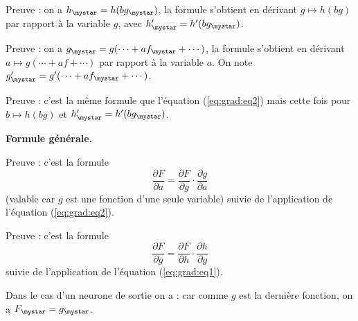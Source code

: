 \documentclass[11pt,class=report,crop=false]{standalone}
\begin{document}
Preuve : on a $h_\mystar = h(b g_\mystar)$, la formule s'obtient en dérivant $g \mapsto h(bg)$ par rapport à la variable $g$, avec 
$h'_\mystar = h'(b g_\mystar)$.

Preuve : on a $g_\mystar = g(\cdots + a f_\mystar+\cdots)$, la formule s'obtient en dérivant $a \mapsto g(\cdots + a f +\cdots)$ par rapport à la variable $a$. On note $g'_\mystar = g'(\cdots + a f_\mystar+\cdots)$.

Preuve : c'est la même formule que l'équation (\ref{eq:grad:eq2}) mais cette fois pour $b \mapsto h(b g)$ et $h'_\mystar = h'(b g_\mystar)$.

\bigskip
\textbf{Formule générale.}


Preuve :
c'est la formule
$$\frac{\partial F}{\partial a} =  \frac{\partial F}{\partial g} \cdot \frac{\partial g}{\partial a}$$
(valable car $g$ est une fonction d'une seule variable) suivie de l'application de l'équation (\ref{eq:grad:eq2}).


Preuve :
c'est la formule
$$\frac{\partial F}{\partial g} =  \frac{\partial F}{\partial h} \cdot \frac{\partial h}{\partial g}$$
suivie de l'application de l'équation (\ref{eq:grad:eq1}).

Dans le cas d'un neurone de sortie on a :
car comme $g$ est la dernière fonction, on a $F_\mystar = g_\mystar$.
\end{document}
